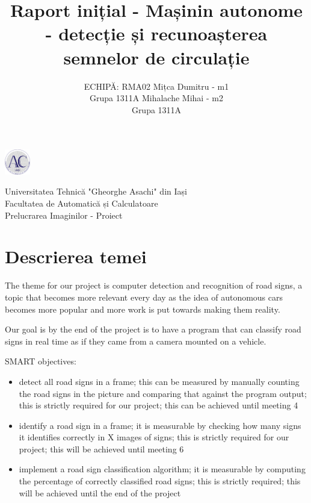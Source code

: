 \documentclass{article}
\title{Raport inițial - Mașinin autonome - detecție și recunoașterea semnelor de circulație}
\author{%
 ECHIPĂ: RMA02
 \AND
 Mițca Dumitru - m1 \\
 Grupa 1311A
 \AND
 Mihalache Mihai - m2 \\
 Grupa 1311A
}
\begin{document}
\noindent\begin{minipage}{0.1\textwidth}%
\includegraphics[width=1.1cm]{imagini/logo_AC.png}
\end{minipage}%
\hfill%
\begin{minipage}{1\textwidth}\raggedright
Universitatea Tehnică "Gheorghe Asachi" din Iași\\
Facultatea de Automatică și Calculatoare\\
Prelucrarea Imaginilor - Proiect
\end{minipage}

\maketitle

\section{Descrierea temei}


The theme for our project is computer detection and recognition of road signs, a topic that becomes
more relevant every day as the idea of autonomous cars becomes more popular and more work is put
towards making them reality.

Our goal is by the end of the project is to have a program that can classify road signs in real time as if they came
from a camera mounted on a vehicle.

SMART objectives:
\begin{itemize}
  \item detect all road signs in a frame; this can be measured by manually counting the road signs in the picture
  and comparing that against the program output; this is strictly required for our project; this can be achieved until
  meeting 4
  \item identify a road sign in a frame; it is measurable by checking how many signs it identifies correctly in X
  images of signs; this is strictly required for our project; this will be achieved until meeting 6
  \item implement a road sign classification algorithm; it is measurable by computing the percentage of correctly classified
  road signs; this is strictly required; this will be achieved until the end of the project
\end{itemize}
\end{document}
